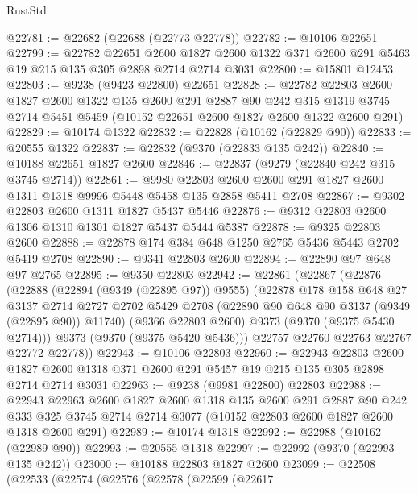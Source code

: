 \begin{lexlean}{RustStd}
\begin{coremodule}
{\begin{coremodule}
{{{{{{{{{{{{{{{{{{{{{{{{{{{{{{{{{{{{{{{@22781 := @22682 (@22688 (@22773 @22778))
@22782 := @10106 @22651
@22799 := @22782
    @22651
    @2600
    @1827
    @2600
    @1322
    @371
    @2600
    @291
    @5463
    @19
    @215
    @135
    @305
    @2898
    @2714
    @2714
    @3031
@22800 := @15801 @12453
@22803 := @9238 (@9423 @22800) @22651
@22828 := @22782
    @22803
    @2600
    @1827
    @2600
    @1322
    @135
    @2600
    @291
    @2887
    @90
    @242
    @315
    @1319
    @3745
    @2714
    @5451
    @5459
    (@10152 @22651 @2600 @1827 @2600 @1322 @2600 @291)
@22829 := @10174 @1322
@22832 := @22828 (@10162 (@22829 @90))
@22833 := @20555 @1322
@22837 := @22832 (@9370 (@22833 @135 @242))
@22840 := @10188 @22651 @1827 @2600
@22846 := @22837 (@9279 (@22840 @242 @315 @3745 @2714))
@22861 := @9980
    @22803
    @2600
    @2600
    @291
    @1827
    @2600
    @1311
    @1318
    @9996
    @5448
    @5458
    @135
    @2858
    @5411
    @2708
@22867 := @9302 @22803 @2600 @1311 @1827 @5437 @5446
@22876 := @9312 @22803 @2600 @1306 @1310 @1301 @1827 @5437 @5444 @5387
@22878 := @9325 @22803 @2600
@22888 := @22878 @174 @384 @648 @1250 @2765 @5436 @5443 @2702 @5419 @2708
@22890 := @9341 @22803 @2600
@22894 := @22890 @97 @648 @97 @2765
@22895 := @9350 @22803
@22942 := @22861
    (@22867
      (@22876
        (@22888
          (@22894 (@9349 (@22895 @97)) @9555)
          (@22878
            @178
            @158
            @648
            @27
            @3137
            @2714
            @2727
            @2702
            @5429
            @2708
            (@22890 @90 @648 @90 @3137 (@9349 (@22895 @90)) @11740)
            (@9366 @22803 @2600)
            @9373
            (@9370 (@9375 @5430 @2714)))
          @9373
          (@9370 (@9375 @5420 @5436)))
        @22757
        @22760
        @22763
        @22767
        @22772
        @22778))
@22943 := @10106 @22803
@22960 := @22943
    @22803
    @2600
    @1827
    @2600
    @1318
    @371
    @2600
    @291
    @5457
    @19
    @215
    @135
    @305
    @2898
    @2714
    @2714
    @3031
@22963 := @9238 (@9981 @22800) @22803
@22988 := @22943
    @22963
    @2600
    @1827
    @2600
    @1318
    @135
    @2600
    @291
    @2887
    @90
    @242
    @333
    @325
    @3745
    @2714
    @2714
    @3077
    (@10152 @22803 @2600 @1827 @2600 @1318 @2600 @291)
@22989 := @10174 @1318
@22992 := @22988 (@10162 (@22989 @90))
@22993 := @20555 @1318
@22997 := @22992 (@9370 (@22993 @135 @242))
@23000 := @10188 @22803 @1827 @2600
@23099 := @22508
    (@22533
      (@22574
        (@22576
          (@22578
            (@22599
              (@22617
}}}}}}}}}}}}}}}}}}}}}}}}}}}}}}}}}}}}}}}
\end{coremodule}}
\end{coremodule}
\end{lexlean}
